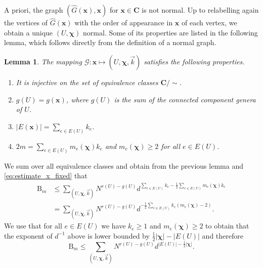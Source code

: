 \documentclass[10pt,a4paper]{amsart}
\newcommand{\abs}[1]{\left| #1 \right|}
\newcommand{\patx}{\boldsymbol{x}}
\newcommand{\patchi}{\boldsymbol{\chi}}
\newtheorem{lemma}{Lemma}[section]
\numberwithin{equation}{section}
\begin{document}
A priori, the graph $(\hat{G}(\patx), \patx)$ for $\patx \in \boldsymbol C$ is not normal. Up to relabelling again the vertices of $\hat{G}(\patx)$ with the order of appearance in $\patx$ of each vertex, we obtain a unique $(U,\patchi) $ normal. Some of its properties are listed in the following lemma, which follows directly from the definition of a normal graph. 
\begin{lemma}\label{lem:eq_of_lem5.7}
The mapping $\mathcal G :\patx \mapsto (U, \patchi,\vec{k}) $ satisfies the following properties. 
\begin{enumerate}[label=(\alph*)] 
    \item It is injective on the set of equivalence classes $\boldsymbol C/\sim$.
    \item $g(U) = g(\patx)$, where $g(U)$ is the sum of the connected component genera of $U$.
    \item $\abs{E(\patx)} = \sum_{e\in E(U)} k_{e}$.
    \item $2m= \sum_{e \in E(U)}m_e(\patchi)k_e$ and $m_{e}(\patchi) \ge 2$ for all $e \in E(U)$.
\end{enumerate}

\end{lemma}
We sum over all equivalence classes and obtain from the previous lemma and \eqref{eq:estimate_x_fixed} that 
\begin{align*}
    \mathrm{B}_{m} &\le \sum_{(U,\patchi,\vec{k})} N^{r(U)-g(U)} d^{ \sum_{e \in E(U)} k_e - \frac{1}{2}\sum_{e\in E(U)} m_{e}(\patchi)k_e} \\
    &= \sum_{(U,\patchi,\vec{k})} N^{r(U)-g(U)} d^{- \frac{1}{2}\sum_{e \in E(U)} k_e(  m_{e}(\patchi)-2)}.
\end{align*}
	We use that for all $e \in E(U)$ we have $k_e \ge 1$ and $m_{e}(\patchi) \ge 2$ to obtain that the exponent of  $d^{-1} $ above is lower bounded by $\frac{1}{2}|\patchi| - |E(U)|$ and therefore
	\begin{equation*}
	        \mathrm{B}_{m} \le \sum_{(U,\patchi,\vec{k})} N^{r(U)-g(U)} d^{|E(U)| - \frac{1}{2}|\patchi|} .
	\end{equation*}
\end{document}
